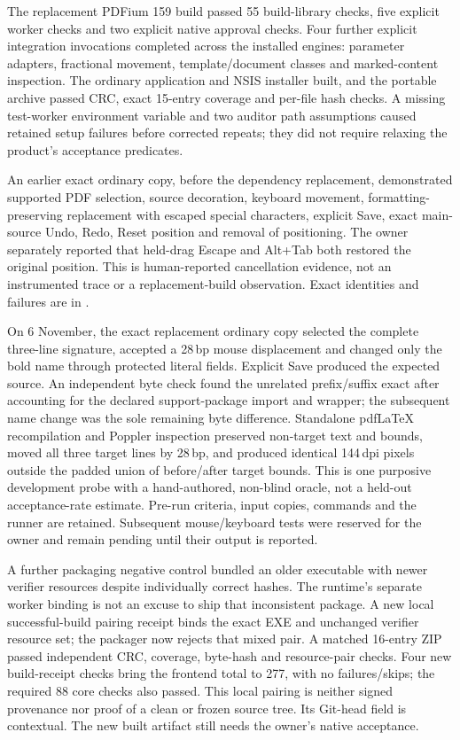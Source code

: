 The replacement PDFium 159 build passed 55 build-library checks, five explicit
worker checks and two explicit native approval checks. Four further explicit
integration invocations completed across the installed engines: parameter
adapters, fractional movement, template/document classes and marked-content
inspection. The ordinary application and NSIS installer built, and the
portable archive passed CRC, exact 15-entry coverage and per-file hash checks.
A missing test-worker environment variable and two auditor path assumptions
caused retained setup failures before corrected repeats; they did not require
relaxing the product's acceptance predicates.

An earlier exact ordinary copy, before the dependency replacement, demonstrated
supported PDF selection, source decoration, keyboard movement, formatting-
preserving replacement with escaped special characters, explicit Save,
exact main-source Undo, Redo, Reset position and removal of positioning.
The owner separately reported that held-drag Escape and Alt+Tab both restored
the original position. This is human-reported cancellation evidence, not an
instrumented trace or a replacement-build observation. Exact identities and
failures are in .

On 6 November, the exact replacement ordinary copy selected the complete
three-line signature, accepted a 28\,bp mouse displacement and changed only
the bold name through protected literal fields. Explicit Save produced the
expected source. An independent byte check found the unrelated prefix/suffix
exact after accounting for the declared support-package import and wrapper;
the subsequent name change was the sole remaining byte difference.
Standalone pdfLaTeX recompilation and Poppler inspection preserved non-target
text and bounds, moved all three target lines by 28\,bp, and produced identical
144\,dpi pixels outside the padded union of before/after target bounds.
This is one purposive development probe with a hand-authored, non-blind oracle,
not a held-out acceptance-rate estimate. Pre-run criteria, input copies,
commands and the runner are retained. Subsequent mouse/keyboard tests were
reserved for the owner and remain pending until their output is reported.

A further packaging negative control bundled an older executable with newer
verifier resources despite individually correct hashes. The runtime's separate
worker binding is not an excuse to ship that inconsistent package. A new local
successful-build pairing receipt binds the exact EXE and unchanged verifier
resource set; the packager now rejects that mixed pair. A matched 16-entry ZIP
passed independent CRC, coverage, byte-hash and resource-pair checks. Four new
build-receipt checks bring the frontend total to 277, with no failures/skips;
the required 88 core checks also passed. This local pairing is neither signed
provenance nor proof of a clean or frozen source tree. Its Git-head field is
contextual. The new built artifact still needs the owner's native acceptance.

